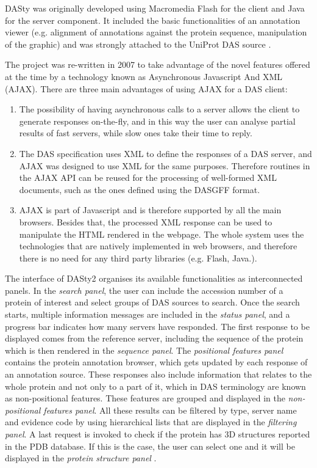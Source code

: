DASty was originally developed using Macromedia Flash for the client and Java for the server component. It included the basic functionalities of an annotation viewer (e.g.  alignment of annotations against the protein sequence, manipulation of the graphic) and was strongly attached to the UniProt DAS source \cite{JON2005}. 

The project was re-written in 2007 to take advantage of the novel features offered at the time by a technology known as Asynchronous Javascript And XML (AJAX). There are three main advantages of using AJAX for a DAS client:
\begin{enumerate}
\item The possibility of having asynchronous calls to a server allows the client to generate responses on-the-fly, and in this way the user can analyse partial results of fast servers, while slow ones take their time to reply.
\item The DAS specification uses XML to define the responses of a DAS server, and AJAX was designed to use XML for the same purposes. Therefore routines in the AJAX API can be reused for the processing of well-formed XML documents, such as the ones defined using the DASGFF format.
\item AJAX is part of Javascript and is therefore supported by all the main browsers. Besides that, the processed XML response can be used to manipulate the HTML rendered in the webpage. The whole system uses the technologies that are natively implemented in web browsers, and therefore there is no need for any third party libraries (e.g. Flash, Java.).
\end{enumerate}

The interface of DASty2 organises its available functionalities as interconnected panels. In the \emph{search panel}, the user can include the accession number of a protein of interest and select groups of DAS sources to search. Once the search starts, multiple information messages are included in the \emph{status panel}, and a progress bar indicates how many servers have responded. The first response to be displayed comes from the reference server, including the sequence of the protein which is then rendered in the \emph{sequence panel}. The \emph{positional features panel} contains the protein annotation browser, which gets updated by each response of an annotation source. These responses also include information that relates to the whole protein and not only to a part of it, which in DAS terminology are known as non-positional features. These features are grouped and displayed in the \emph{non-positional features panel}. All these results can be filtered by type, server name and evidence code by using hierarchical lists that are displayed in the \emph{filtering panel}. A last request is invoked to check if the protein has 3D structures reported in the PDB database. If this is the case, the user can select one and it will be displayed in the \emph{protein structure panel} \cite{JIM2011}.

